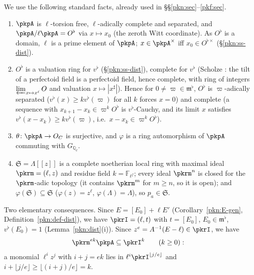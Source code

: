 \documentclass[10pt]{amsart}
\theoremstyle{definition}
\theoremstyle{remark}
\newcommand{\Q}{\mathbb Q}
\begin{document}
We use the following standard facts, already used in \S\S\ref{pkn:sec}--\ref{pkf:sec}.
\begin{enumerate}
\item[(W1)] $\pkpA$ is $\ell$-torsion free, $\ell$-adically complete and separated, and
$\pkpA/\ell\pkpA=O^\flat$ via $x\mapsto x_0$ (the zeroth Witt coordinate). As $O^\flat$ is a domain,
$\ell$ is a prime element of $\pkpA$; $x\in\pkpA^\times$ iff $x_0\in O^{\flat\times}$
(\S\ref{pkn:ss-dist}).
\item[(W2)] $O^\flat$ is a valuation ring for $v^\flat$ (\S\ref{pkn:ss-dist}), complete for $v^\flat$
(Scholze \cite[Lemma~3.4(iii)]{pkfScholze12}: the tilt of a perfectoid field is a perfectoid field, hence complete, with ring of integers $\varprojlim_{x\mapsto x^\ell}O$ and valuation $x\mapsto|x^\sharp|$). Hence for $0\ne\varpi\in\mathfrak m^\flat$,
$O^\flat$ is $\varpi$-adically separated ($v^\flat(x)\ge kv^\flat(\varpi)$ for all $k$ forces $x=0$) and
complete (a sequence with $x_{k+1}-x_k\in\varpi^kO^\flat$ is $v^\flat$-Cauchy, and its limit $x$
satisfies $v^\flat(x-x_k)\ge kv^\flat(\varpi)$, i.e.\ $x-x_k\in\varpi^kO^\flat$).
\item[(W3)] $\theta\colon\pkpA\to O_C$ is surjective, and $\varphi$ is a ring automorphism of $\pkpA$
commuting with $G_{\Q_\ell}$.
\item[(W4)] $\mathfrak S=\Lambda[[z]]$ is a complete noetherian local ring with maximal ideal
$\pkrm=(\ell,z)$ and residue field $k=\mathbb F_{\ell^f}$; every ideal $\pkrm^n$ is closed for the
$\pkrm$-adic topology (it contains $\pkrm^m$ for $m\ge n$, so it is open); and
$\varphi(\mathfrak S)\subseteq\mathfrak S$ ($\varphi(z)=z^\ell$, $\varphi(\Lambda)=\Lambda$), so
$p_a\in\mathfrak S$.
\end{enumerate}
Two elementary consequences. Since $E=[E_0]+\ell E'$ (Corollary~\ref{pkn:E-gen},
Definition~\ref{pkn:def-dist}), we have $\pkrI=(\ell,t)$ with $t=[E_0]$, $E_0\in\mathfrak m^\flat$,
$v^\flat(E_0)=1$ (Lemma~\ref{pkn:dist}(i)). Since $z^e=A^{-1}(E-\ell)\in\pkrI$, we have
\begin{equation}\label{pkr:eq-zE}
\pkrm^{ek}\pkpA\subseteq\pkrI^k\qquad(k\ge0):
\end{equation}
a monomial $\ell^iz^j$ with $i+j=ek$ lies in $\ell^i\pkrI^{\lfloor j/e\rfloor}$ and
$i+\lfloor j/e\rfloor\ge\lfloor(i+j)/e\rfloor=k$.
\end{document}
